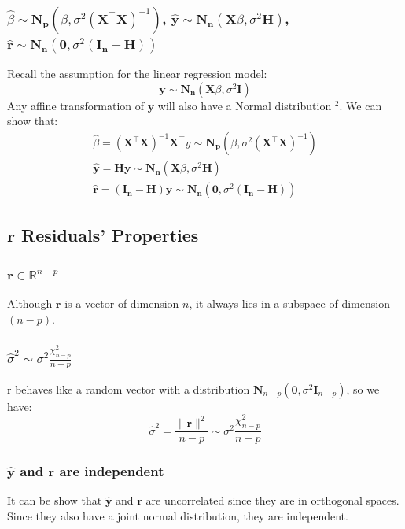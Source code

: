 \documentclass[11pt,a4paper]{article}
\begin{document}
\subsubsection{$\hat{\beta}\sim \mathbf{N}_{\mathbf{p}}\left(\beta, \sigma^{2}\left(\mathbf{X}^{\top} \mathbf{X}\right)^{-1}\right)$, $\hat{\mathbf{y}}\sim\mathbf{N}_{\mathbf{n}}\left(\mathbf{X} \beta, \sigma^{2} \mathbf{H}\right)$, $\hat{\mathbf{r}}\sim \mathbf{N}_{\mathbf{n}}\left(\mathbf{0}, \sigma^{2}\left(\mathbf{I}_{\mathbf{n}}-\mathbf{H}\right)\right)$}
Recall the assumption for the linear regression model:
$$
\mathbf{y} \sim \mathbf{N}_{\mathbf{n}}\left(\mathbf{X} \beta, \sigma^{2} \mathbf{I}\right)
$$
Any affine transformation of $\mathbf{y}$ will also have a Normal distribution $^{2}$.
We can show that:
$$
\begin{gathered}
\hat{\beta}=\left(\mathbf{X}^{\top} \mathbf{X}\right)^{-1} \mathbf{X}^{\top} y \sim \mathbf{N}_{\mathbf{p}}\left(\beta, \sigma^{2}\left(\mathbf{X}^{\top} \mathbf{X}\right)^{-1}\right) \\
\hat{\mathbf{y}}=\mathbf{H} \mathbf{y} \sim \mathbf{N}_{\mathbf{n}}\left(\mathbf{X} \beta, \sigma^{2} \mathbf{H}\right) \\
\hat{\mathbf{r}}=\left(\mathbf{I}_{\mathbf{n}}-\mathbf{H}\right) \mathbf{y} \sim \mathbf{N}_{\mathbf{n}}\left(\mathbf{0}, \sigma^{2}\left(\mathbf{I}_{\mathbf{n}}-\mathbf{H}\right)\right)
\end{gathered}
$$
\subsection{$\mathbf{r}$ Residuals’ Properties}
\subsubsection{$\mathbf{r}\in \mathbb{R}^{n-p}$}
Although $\mathbf{r}$ is a vector of dimension $n$, it always lies in a subspace of dimension $(n − p)$.
\subsubsection{$\hat{\sigma}^{2}\sim\sigma^{2} \frac{\chi_{n-p}^{2}}{n-p}$}
r behaves like a random vector with a distribution $\mathbf{N}_{n-p}\left(\mathbf{0}, \sigma^{2} \mathbf{I}_{n-p}\right)$, so we have:
$$
\hat{\sigma}^{2}=\frac{\|\mathbf{r}\|^{2}}{n-p} \sim \sigma^{2} \frac{\chi_{n-p}^{2}}{n-p}
$$
\subsubsection{$\hat{\mathbf{y}}$ and $\boldsymbol{r}$ are independent}
It can be show that $\hat{\mathbf{y}}$ and $\boldsymbol{r}$ are uncorrelated since they are in orthogonal spaces. Since they also have a joint normal distribution, they are independent.
\end{document}
